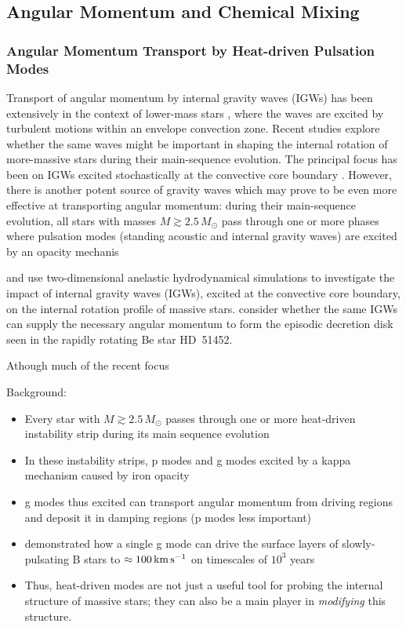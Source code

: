 
\subsection{Angular Momentum and Chemical Mixing}



{\color{brown}
\subsubsection{Angular Momentum Transport by Heat-driven Pulsation Modes}

Transport of angular momentum by internal gravity waves (IGWs) has been extensively in the context of lower-mass stars \citep[e.g.,][]{Schatzman:1993,Kumar:1997,Zahn:1997,Talon:2002,Talon:2005,Rogers:2008}, where the waves are excited by turbulent motions within an envelope convection zone. Recent studies explore whether the same waves might be important in shaping the internal rotation of more-massive stars during their main-sequence evolution. The principal focus has been on IGWs excited stochastically at the convective core boundary \citep[e.g.][]{Rogers:2013,Lee:2014,Rogers:2015}. However, there is another potent source of gravity waves which may prove to be even more effective at transporting angular momentum: during their main-sequence evolution, all stars with masses $M \gtrsim 2.5\,M_{\odot}$ pass through one or more phases where pulsation modes (standing acoustic and internal gravity waves) are excited by an opacity mechanis

\citet{Rogers:2013aa} and
\citet{Rogers:2015aa} use two-dimensional anelastic hydrodynamical
simulations to investigate the impact of internal gravity waves
(IGWs), excited at the convective core boundary, on the internal
rotation profile of massive stars. \citet{Lee:2014aa} consider whether
the same IGWs can supply the necessary angular momentum to form the
episodic decretion disk seen in the rapidly rotating Be star HD~51452.


Athough much of the recent focus 

Background:
 \begin{itemize}
 \item Every star with $M \gtrsim 2.5\,M_{\odot}$ passes through one or more heat-driven instability strip during its main sequence evolution
 \item In these instability strips, p modes and g modes excited by a kappa mechanism caused by iron opacity
 \item g modes thus excited can transport angular momentum from driving regions and deposit it in damping regions (p modes less important)
 \item \citet{Townsend:2017aa} demonstrated how a single g mode can drive the surface layers of slowly-pulsating B stars to $\approx 100\,{\rm km\,s^{-1}}$ on timescales of $10^{3}$ years
 \item Thus, heat-driven modes are not just a useful tool for probing the internal structure of massive stars; they can also be a main player in \emph{modifying} this structure.
 \end{itemize}
 
}
